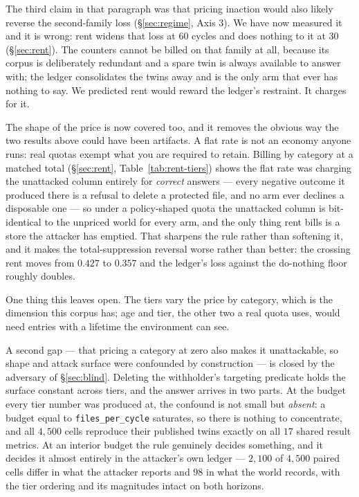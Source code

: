 The third claim in that paragraph was that pricing inaction would also
likely reverse the second-family loss (\S\ref{sec:regime}, Axis 3). We
have now measured it and it is wrong: rent widens that loss at 60 cycles
and does nothing to it at 30 (\S\ref{sec:rent}). The counters cannot be
billed on that family at all, because its corpus is deliberately
redundant and a spare twin is always available to answer with; the
ledger consolidates the twins away and is the only arm that ever has
nothing to say. We predicted rent would reward the ledger's restraint.
It charges for it.

The shape of the price is now covered too, and it removes the obvious
way the two results above could have been artifacts. A flat rate is not
an economy anyone runs: real quotas exempt what you are required to
retain. Billing by category at a matched total (\S\ref{sec:rent},
Table~\ref{tab:rent-tiers}) shows the flat rate was charging the
unattacked column entirely for \emph{correct} answers --- every negative
outcome it produced there is a refusal to delete a protected file, and
no arm ever declines a disposable one --- so under a policy-shaped
quota the unattacked column is bit-identical to the unpriced world for
every arm, and the only thing rent bills is a store the attacker has
emptied. That sharpens the rule rather than softening it, and it makes
the total-suppression reversal worse rather than better: the crossing
rent moves from $0.427$ to $0.357$ and the ledger's loss against the
do-nothing floor roughly doubles.

One thing this leaves open. The tiers vary the price by category, which
is the dimension this corpus has; age and tier, the other two a real
quota uses, would need entries with a lifetime the environment can see.

A second gap --- that pricing a category at zero also makes it
unattackable, so shape and attack surface were confounded by
construction --- is closed by the adversary of \S\ref{sec:blind}. Deleting the withholder's
targeting predicate holds the surface constant across tiers, and the
answer arrives in two parts. At the budget every tier number was
produced at, the confound is not small but \emph{absent}: a budget equal
to \texttt{files\_per\_cycle} saturates, so there is nothing to
concentrate, and all $4{,}500$ cells reproduce their published twins
exactly on all $17$ shared result metrics. At an interior budget the rule
genuinely decides something, and it decides it almost entirely in the
attacker's own ledger --- $2{,}100$ of $4{,}500$ paired cells differ in
what the attacker reports and $98$ in what the world records, with the
tier ordering and its magnitudes intact on both horizons.

